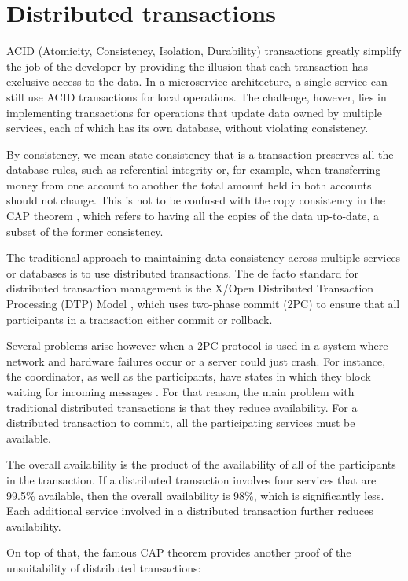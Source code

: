 \documentclass[conference]{IEEEtran}
\begin{document}
\section{Distributed transactions}

ACID (Atomicity, Consistency, Isolation, Durability) transactions greatly simplify the job of the developer by providing the illusion that each transaction has exclusive access to the data. In a microservice architecture, a single service can still use ACID transactions for local operations. The challenge, however, lies in implementing transactions for operations that update data owned by multiple services, each of which has its own database, without violating consistency.

By consistency, we mean state consistency that is a transaction preserves all the database rules, such as  referential integrity or, for example, when transferring money from one account to another the total amount held in both accounts should not change. This is not to be confused with the copy consistency in the CAP theorem \cite{acid-cap}, which refers to having all the copies of the data up-to-date, a subset of the former consistency.

The traditional approach to maintaining data consistency across multiple services or databases is to use distributed transactions. The de facto standard for distributed transaction management is the X/Open Distributed Transaction Processing (DTP) Model \cite{dtp}, which uses two-phase commit (2PC) to ensure that all participants in a transaction either commit or rollback. 

Several problems arise however when a 2PC protocol is used in a system where network and hardware failures occur or a server could just crash. For instance, the coordinator, as well as the participants, have states in which they block waiting for incoming messages \cite{distributed-systems-2pc}. For that reason, the main problem with traditional distributed transactions is that they reduce availability. For a distributed transaction to commit, all the participating services must be available.

The overall availability is the product of the availability of all of the participants in the transaction. If a distributed transaction involves four services that are 99.5\% available, then the overall availability is 98\%, which is significantly less. Each additional service involved in a distributed transaction further reduces availability.

On top of that, the famous CAP theorem provides another proof of the unsuitability of distributed transactions:
\end{document}
